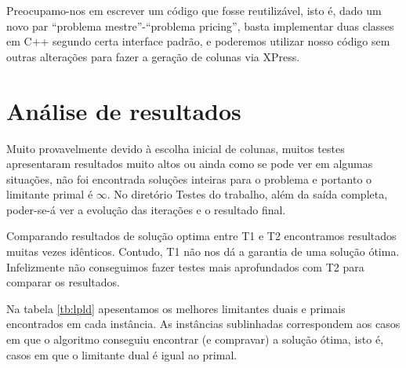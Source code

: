 \documentclass[letterpaper,11pt]{article}
\begin{document}
Preocupamo-nos em escrever um código que fosse reutilizável, isto é,
dado um novo par ``problema mestre''-``problema pricing'', basta
implementar duas classes em C++ segundo certa interface padrão, e
poderemos utilizar nosso código sem outras alterações para fazer a
geração de colunas via XPress.

\section{Análise de resultados}
Muito provavelmente devido à escolha inicial de colunas, muitos testes
apresentaram resultados muito altos ou ainda como se pode ver em
algumas situações, não foi encontrada soluções inteiras para o
problema e portanto o limitante primal é $\infty$. No diretório Testes do trabalho, além da saída completa,
poder-se-á ver a evolução das iterações e o resultado final.

Comparando resultados de solução optima entre T1 e T2 encontramos
resultados muitas vezes idênticos. Contudo, T1 não nos dá a garantia de
uma solução ótima. Infelizmente não conseguimos fazer testes mais
aprofundados com T2 para comparar os resultados.

Na tabela \ref{tb:lpld} apesentamos os melhores limitantes duais e
primais encontrados em cada instância. As instâncias sublinhadas
correspondem aos casos em que o algoritmo conseguiu encontrar (e
compravar) a solução ótima, isto é, casos em que o limitante dual é
igual ao primal.
\end{document}

